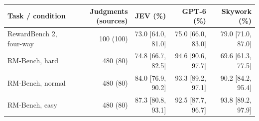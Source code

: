 \begin{tabular}{@{}lrrrr@{}}
\toprule
Task / condition & Judgments (sources) & JEV (\%) & GPT-6 (\%) & Skywork (\%) \\
\midrule
RewardBench 2, four-way & 100 (100) & 73.0 [64.0, 81.0] & 75.0 [66.0, 83.0] & 79.0 [71.0, 87.0] \\
RM-Bench, hard & 480 (80) & 74.8 [66.7, 82.5] & 94.6 [90.6, 97.7] & 69.6 [61.3, 77.5] \\
RM-Bench, normal & 480 (80) & 84.0 [76.9, 90.2] & 93.3 [89.2, 97.1] & 90.2 [84.2, 95.4] \\
RM-Bench, easy & 480 (80) & 87.3 [80.8, 93.1] & 92.5 [87.7, 96.7] & 93.8 [89.2, 97.9] \\
\bottomrule
\end{tabular}
